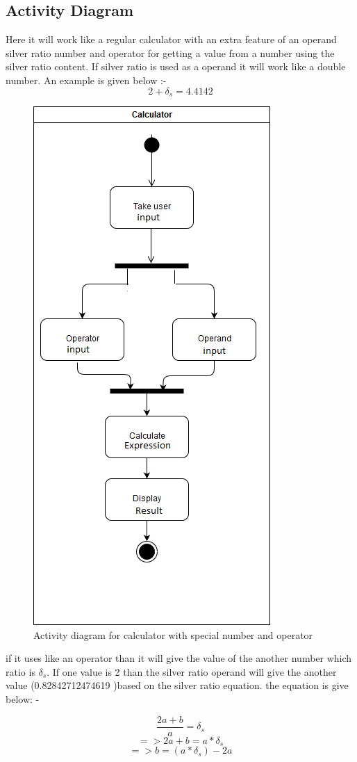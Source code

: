 \documentclass{article}
\begin{document}
\subsection{Activity Diagram}
Here it will work like a regular calculator with an extra feature of an operand silver ratio number and operator for getting a value from a number using the silver ratio content.
If silver ratio is used as a operand it will work like a double number.
An example is given below :- 
$$2+\delta_s = 4.4142$$
\begin{figure}[!htb]
 \centering
  \includegraphics[width=.50\textwidth]{activity}
  \caption{Activity diagram for calculator with special number and operator}
\end{figure}

if it uses like an operator than it will give the value of the another number which ratio is $\delta_s$. If one value is 2 than the silver ratio operand will give the another value (0.82842712474619 )based on the silver ratio equation.
the equation is give below: - \newline

\[ \dfrac{2a + b}{a}  = \delta_s \]
\[ => {2a + b}  = {a *\delta_s} \]
\[ => {b}  = {(a *\delta_s) - 2a} \]
\end{document}
